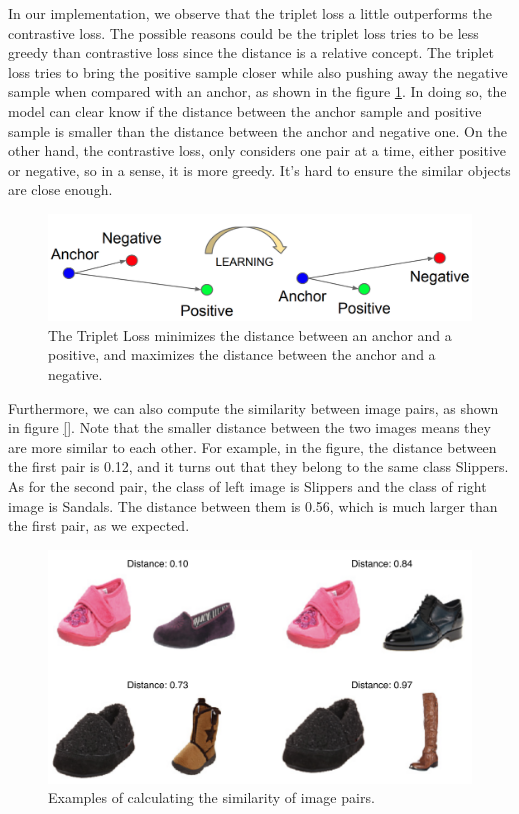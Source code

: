 In our implementation, we observe that the triplet loss a little outperforms the contrastive loss. The possible reasons could be the triplet loss tries to be less greedy than contrastive loss since the distance is a relative concept. The triplet loss tries to bring the positive sample closer while also pushing away the negative sample when compared with an anchor, as shown in the figure \ref{fig:tripletloss}. In doing so, the model can clear know if the distance between the anchor sample and positive sample is smaller than the distance between the anchor and negative one. On the other hand, the contrastive loss, only considers one pair at a time, either positive or negative, so in a sense, it is more greedy. It's hard to ensure the similar objects are close enough. 

\begin{figure}[h]
  \centering
  \includegraphics[width=\linewidth]{figs/tripletloss.png}
  \caption{The Triplet Loss minimizes the distance between an anchor and a positive, and maximizes the distance between the anchor and a negative.}
  \label{fig:tripletloss}
\end{figure}


Furthermore, we can also compute the similarity between image pairs, as shown in figure \ref{}. Note that the smaller distance between the two images means they are more similar to each other. For example, in the figure, the distance between the first pair is 0.12, and it turns out that they belong to the same class Slippers. As for the second pair, the class of left image is Slippers and the class of right image is Sandals. The distance between them is 0.56, which is much larger than the first pair, as we expected. 

\begin{figure}[h]
  \centering
  \includegraphics[width=\linewidth]{figs/similarity.png}
  \caption{Examples of calculating the similarity of image pairs.}
  \label{fig:similarity}
\end{figure}


